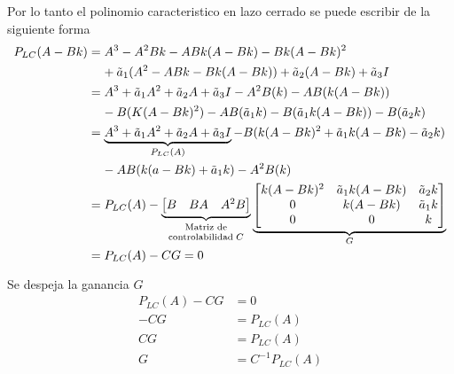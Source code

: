 Por lo tanto el polinomio caracteristico en lazo cerrado se puede escribir de la siguiente forma
\[
    \begin{split}
            P_{LC}(A-Bk) & = A^{3} - A^{2}Bk - ABk(A-Bk) -Bk(A-Bk)^{2} \\ & \;\;\;\; + \tilde{a}_{1}(A^{2} - ABk - Bk(A-Bk)) + \tilde{a}_{2}(A-Bk) + \tilde{a}_{3}I \\
            & = A^{3} + \tilde{a}_{1}A^{2} + \tilde{a}_{2}A + \tilde{a}_{3}I - A^{2}B(k) - AB(k(A-Bk)) \\
            & \;\;\;\; - B(K(A-Bk)^{2}) - AB(\tilde{a}_{1}k) - B(\tilde{a}_{1}k(A-Bk)) -B(\tilde{a}_{2}k)\\
            & = \underbrace{A^{3} + \tilde{a}_{1}A^{2} + \tilde{a}_{2}A + \tilde{a}_{3}I}_{P_{LC}(A)} -B(k(A-Bk)^{2}+\tilde{a}_{1}k(A-Bk)-\tilde{a}_{2}k) \\ & \;\;\;\; -AB(k(a-Bk)+\tilde{a}_{1}k) - A^{2}B(k) \\
            & = P_{LC}(A) - 
            \underbrace{
                \begin{bmatrix}
                    B & BA & A^{2}B
                \end{bmatrix}}_
                {
                \begin{scriptsize}
                    \begin{matrix}
                        \text{Matriz de}\\
                        \text{controlabilidad}\;C
                    \end{matrix}
                \end{scriptsize}
                }
            \underbrace
            {
            \begin{bmatrix}
                k(A-Bk)^{2} & \tilde{a}_{1}k(A-Bk) & \tilde{a}_{2}k \\
                0 & k(A-Bk) & \tilde{a}_{1}k\\
                0 & 0 & k
            \end{bmatrix}
            }_{G}\\
            & = P_{LC}(A) -CG = 0
    \end{split}
\]

Se despeja la ganancia \( G \)
\[
    \begin{split}
        P_{LC}(A) - CG & = 0 \\
        -CG & = P_{LC}(A) \\
        CG & = P_{LC}(A) \\
        G & = C^{-1}P_{LC}(A)
    \end{split}
\]

